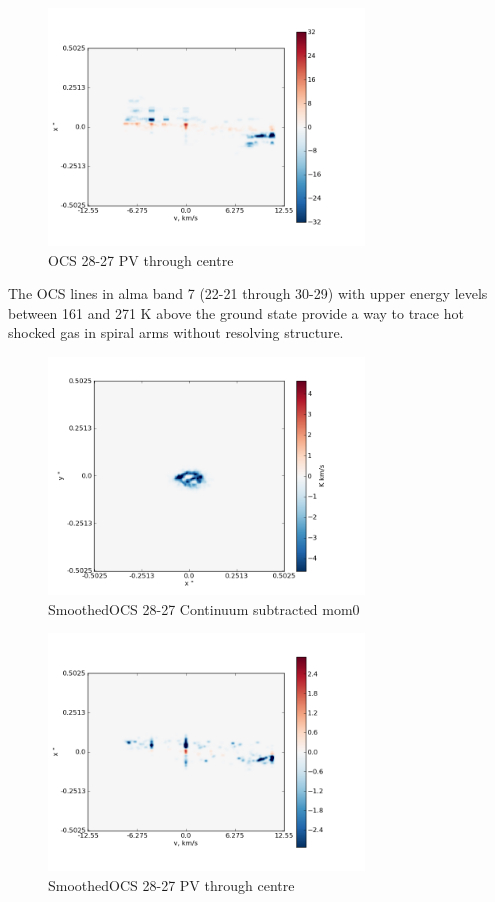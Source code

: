 \documentclass[useAMS,usenatbib]{mn2e}
\begin{document}
\begin{figure}
 \includegraphics[width=84mm]{Figures/sim/imageOCS_28-27_30deg_PV_centre.png}

 \caption{OCS 28-27 PV through centre}
\end{figure}

The OCS lines in alma band 7 (22-21 through 30-29) with upper energy levels between 161 and 271 K above the ground state provide a way to trace hot shocked gas in spiral arms without resolving structure.\newline

\begin{figure}
 \includegraphics[width=84mm]{Figures/sim/imagesmoothedOCS_28-27_30deg_contSub.png}

 \caption{SmoothedOCS 28-27 Continuum subtracted mom0}
\end{figure}


 
\begin{figure}
 \includegraphics[width=84mm]{Figures/sim/imagesmoothedOCS_28-27_30deg_PV_centre.png}

 \caption{SmoothedOCS 28-27 PV through centre}
\end{figure}
\end{document}
